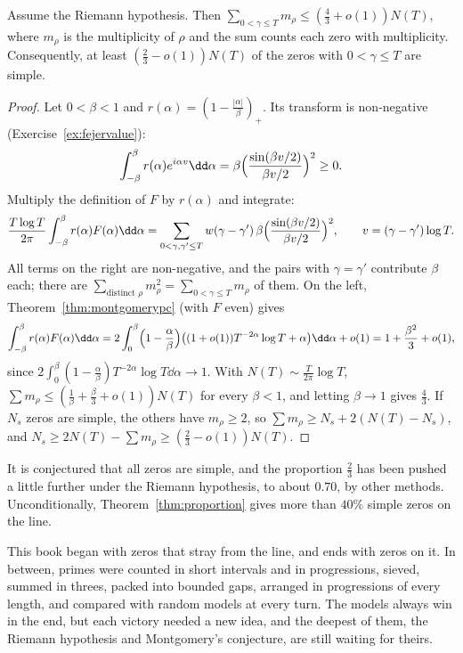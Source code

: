 \begin{corollary}\label{cor:simplezeros}
Assume the Riemann hypothesis. Then $\sum_{0<\gamma\le T}m_\rho\le(\frac43+o(1))N(T)$, where $m_\rho$ is the multiplicity of $\rho$ and the sum counts each zero with multiplicity. Consequently, at least $(\frac23-o(1))N(T)$ of the zeros with $0<\gamma\le T$ are simple.
\end{corollary}
\begin{proof}
Let $0<\beta<1$ and $r(\alpha)=(1-\frac{|\alpha|}\beta)_+$. Its transform is non-negative (Exercise~\ref{ex:fejervalue}):
\[
\int_{-\beta}^\beta r(\alpha)e^{i\alpha v}\dd\alpha=\beta\Bigl(\frac{\sin(\beta v/2)}{\beta v/2}\Bigr)^2\ge0.
\]
Multiply the definition of $F$ by $r(\alpha)$ and integrate:
\[
\frac{T\log T}{2\pi}\int_{-\beta}^\beta r(\alpha)F(\alpha)\dd\alpha=\sum_{0<\gamma,\gamma'\le T}w(\gamma-\gamma')\,\beta\Bigl(\frac{\sin(\beta v/2)}{\beta v/2}\Bigr)^2,\qquad v=(\gamma-\gamma')\log T.
\]
All terms on the right are non-negative, and the pairs with $\gamma=\gamma'$ contribute $\beta$ each; there are $\sum_{\text{distinct }\rho}m_\rho^2=\sum_{0<\gamma\le T}m_\rho$ of them. On the left, Theorem~\ref{thm:montgomerypc} (with $F$ even) gives
\[
\int_{-\beta}^\beta r(\alpha)F(\alpha)\dd\alpha=2\int_0^\beta\Bigl(1-\frac\alpha\beta\Bigr)\bigl((1+o(1))T^{-2\alpha}\log T+\alpha\bigr)\dd\alpha+o(1)=1+\frac{\beta^2}3+o(1),
\]
since $2\int_0^\beta(1-\frac\alpha\beta)T^{-2\alpha}\log T\dd\alpha\to1$. With $N(T)\sim\frac T{2\pi}\log T$, $\sum m_\rho\le(\frac1\beta+\frac\beta3+o(1))N(T)$ for every $\beta<1$, and letting $\beta\to1$ gives $\frac43$. If $N_s$ zeros are simple, the others have $m_\rho\ge2$, so $\sum m_\rho\ge N_s+2(N(T)-N_s)$, and $N_s\ge2N(T)-\sum m_\rho\ge(\frac23-o(1))N(T)$.
\end{proof}

It is conjectured that all zeros are simple, and the proportion $\frac23$ has been pushed a little further under the Riemann hypothesis, to about $0.70$, by other methods. Unconditionally, Theorem~\ref{thm:proportion} gives more than $40\%$ simple zeros on the line.

This book began with zeros that stray from the line, and ends with zeros on it. In between, primes were counted in short intervals and in progressions, sieved, summed in threes, packed into bounded gaps, arranged in progressions of every length, and compared with random models at every turn. The models always win in the end, but each victory needed a new idea, and the deepest of them, the Riemann hypothesis and Montgomery's conjecture, are still waiting for theirs.

